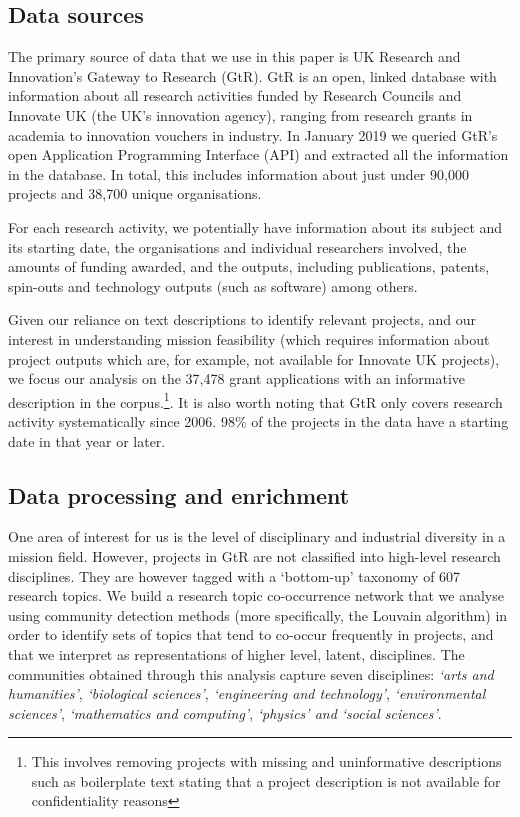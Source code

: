 \documentclass[11pt]{article}
\begin{document}
\subsection{Data sources}
\label{subsec:data}

The primary source of data that we use in this paper is UK Research and Innovation’s Gateway to Research (GtR). GtR is an open, linked database with information about all research activities funded by Research Councils and Innovate UK (the UK’s innovation agency), ranging from research grants in academia to innovation vouchers in industry. In January 2019 we queried GtR’s open Application Programming Interface (API) and extracted all the information in the database. In total, this includes information about just under 90,000 projects and 38,700 unique organisations.

For each research activity, we potentially have information about its subject and its starting date, the organisations and individual researchers involved, the amounts of funding awarded, and the outputs, including publications, patents, spin-outs and technology outputs (such as software) among others.

Given our reliance on text descriptions to identify relevant projects, and our interest in understanding mission feasibility (which requires information about project outputs which are, for example, not available for Innovate UK projects), we focus our analysis on the 37,478 grant applications with an informative description in the corpus.\footnote{This involves removing projects with missing and uninformative descriptions such as boilerplate text stating that a project description is not available for confidentiality reasons}. It is also worth noting that GtR only covers research activity systematically since 2006. 98\% of the projects in the data have a starting date in that year or later.

\subsection{Data processing and enrichment}
One area of interest for us is the level of disciplinary and industrial diversity in a mission field. However, projects in GtR are not classified into high-level research disciplines. They are however tagged with a `bottom-up’ taxonomy of 607 research topics. We build a research topic co-occurrence network that we analyse using community detection methods (more specifically, the Louvain algorithm) in order to identify sets of topics that tend to co-occur frequently in projects, and that we interpret as representations of higher level, latent, disciplines. The communities obtained through this analysis capture seven disciplines: \emph{`arts and humanities'}, \emph{`biological sciences'}, \emph{`engineering and technology'}, \emph{`environmental sciences'}, \emph{`mathematics and computing'}, \emph{`physics' and `social sciences'}.
\end{document}
